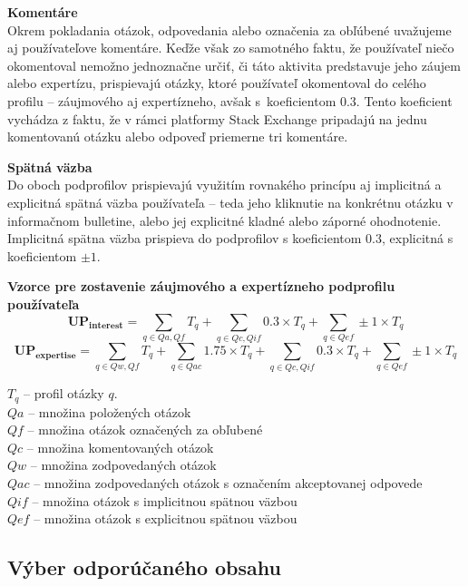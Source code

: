 \textbf{Komentáre}\\
Okrem pokladania otázok, odpovedania alebo označenia za obľúbené uvažujeme aj používateľove komentáre. Keďže však
zo samotného faktu, že používateľ niečo okomentoval nemožno jednoznačne určiť, či táto aktivita predstavuje jeho záujem
alebo expertízu, prispievajú otázky, ktoré používateľ okomentoval do celého profilu -- záujmového aj expertízneho, avšak
s~koeficientom $0.3$. Tento koeficient vychádza z faktu, že v rámci platformy Stack Exchange pripadajú na jednu
komentovanú otázku alebo odpoveď priemerne tri komentáre.

\textbf{Spätná väzba}\\
Do oboch podprofilov prispievajú využitím rovnakého princípu aj implicitná a explicitná spätná väzba používateľa --
teda jeho kliknutie na konkrétnu otázku v informačnom bulletine, alebo jej explicitné kladné alebo záporné ohodnotenie.
Implicitná spätna väzba prispieva do podprofilov s koeficientom $0.3$, explicitná s koeficientom $\pm1$.

\textbf{Vzorce pre zostavenie záujmového a expertízneho podprofilu používateľa}\\
$$\mathbf{UP_{interest}} = \sum_{q \in Qa, Qf}T_q + \sum_{q \in Qc, Qif}0.3 \times T_q + \sum_{q \in Qef}\pm1 \times T_q$$
$$\mathbf{UP_{expertise}} = \sum_{q \in Qw, Qf}T_q + \sum_{q \in Qac}1.75 \times T_q + \sum_{q \in Qc, Qif}0.3 \times T_q + \sum_{q \in Qef}\pm1 \times T_q$$
\begin{adjustwidth}{1cm}{1cm}
$T_q$ -- profil otázky $q$.\\
$Qa$ -- množina položených otázok\\
$Qf$ -- množina otázok označených za obľubené\\
$Qc$ -- množina komentovaných otázok\\
$Qw$ -- množina zodpovedaných otázok\\
$Qac$ -- množina zodpovedaných otázok s označením akceptovanej odpovede\\
$Qif$ -- množina otázok s implicitnou spätnou väzbou\\
$Qef$ -- množina otázok s explicitnou spätnou väzbou\\
\end{adjustwidth}

\subsection{Výber odporúčaného obsahu}\label{design:rec-retrieval}

